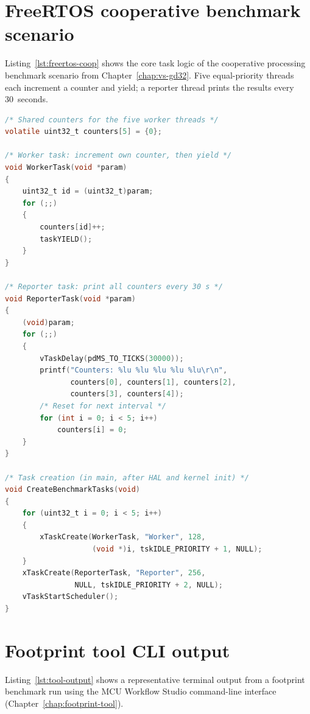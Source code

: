 \pagebreak

\section{FreeRTOS cooperative benchmark scenario}
\label{sec:appendix-freertos-coop}

Listing~\ref{lst:freertos-coop} shows the core task logic of the cooperative processing
benchmark scenario from Chapter~\ref{chap:vs-gd32}. Five equal-priority threads each
increment a counter and yield; a reporter thread prints the results every 30~seconds.

\begin{lstlisting}[language=C, caption={FreeRTOS cooperative scenario --- task functions (STM32, simplified).}, label={lst:freertos-coop}]
/* Shared counters for the five worker threads */
volatile uint32_t counters[5] = {0};

/* Worker task: increment own counter, then yield */
void WorkerTask(void *param)
{
    uint32_t id = (uint32_t)param;
    for (;;)
    {
        counters[id]++;
        taskYIELD();
    }
}

/* Reporter task: print all counters every 30 s */
void ReporterTask(void *param)
{
    (void)param;
    for (;;)
    {
        vTaskDelay(pdMS_TO_TICKS(30000));
        printf("Counters: %lu %lu %lu %lu %lu\r\n",
               counters[0], counters[1], counters[2],
               counters[3], counters[4]);
        /* Reset for next interval */
        for (int i = 0; i < 5; i++)
            counters[i] = 0;
    }
}

/* Task creation (in main, after HAL and kernel init) */
void CreateBenchmarkTasks(void)
{
    for (uint32_t i = 0; i < 5; i++)
    {
        xTaskCreate(WorkerTask, "Worker", 128,
                    (void *)i, tskIDLE_PRIORITY + 1, NULL);
    }
    xTaskCreate(ReporterTask, "Reporter", 256,
                NULL, tskIDLE_PRIORITY + 2, NULL);
    vTaskStartScheduler();
}
\end{lstlisting}

\pagebreak

\section{Footprint tool CLI output}
\label{sec:appendix-tool-output}

Listing~\ref{lst:tool-output} shows a representative terminal output from a footprint
benchmark run using the MCU Workflow Studio command-line interface
(Chapter~\ref{chap:footprint-tool}).

